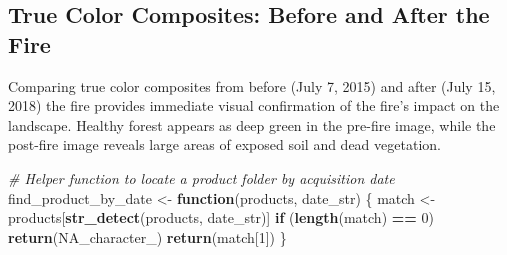 \documentclass[
]{article}
\newenvironment{Shaded}{\begin{snugshade}}{\end{snugshade}}
\newcommand{\CommentTok}[1]{\textcolor[rgb]{0.56,0.35,0.01}{\textit{#1}}}
\newcommand{\ConstantTok}[1]{\textcolor[rgb]{0.56,0.35,0.01}{#1}}
\newcommand{\ControlFlowTok}[1]{\textcolor[rgb]{0.13,0.29,0.53}{\textbf{#1}}}
\newcommand{\DecValTok}[1]{\textcolor[rgb]{0.00,0.00,0.81}{#1}}
\newcommand{\FunctionTok}[1]{\textcolor[rgb]{0.13,0.29,0.53}{\textbf{#1}}}
\newcommand{\NormalTok}[1]{#1}
\newcommand{\OtherTok}[1]{\textcolor[rgb]{0.56,0.35,0.01}{#1}}
\newcommand{\SpecialCharTok}[1]{\textcolor[rgb]{0.81,0.36,0.00}{\textbf{#1}}}
\begin{document}
\subsection{True Color Composites: Before and After the
Fire}\label{true-color-composites-before-and-after-the-fire}

Comparing true color composites from before (July 7, 2015) and after
(July 15, 2018) the fire provides immediate visual confirmation of the
fire's impact on the landscape. Healthy forest appears as deep green in
the pre-fire image, while the post-fire image reveals large areas of
exposed soil and dead vegetation.

\begin{Shaded}
\begin{Highlighting}[]
\CommentTok{\# Helper function to locate a product folder by acquisition date}
\NormalTok{find\_product\_by\_date }\OtherTok{\textless{}{-}} \ControlFlowTok{function}\NormalTok{(products, date\_str) \{}
\NormalTok{  match }\OtherTok{\textless{}{-}}\NormalTok{ products[}\FunctionTok{str\_detect}\NormalTok{(products, date\_str)]}
  \ControlFlowTok{if}\NormalTok{ (}\FunctionTok{length}\NormalTok{(match) }\SpecialCharTok{==} \DecValTok{0}\NormalTok{) }\FunctionTok{return}\NormalTok{(}\ConstantTok{NA\_character\_}\NormalTok{)}
  \FunctionTok{return}\NormalTok{(match[}\DecValTok{1}\NormalTok{])}
\NormalTok{\}}


\end{Highlighting}
\end{Shaded}
\end{document}
